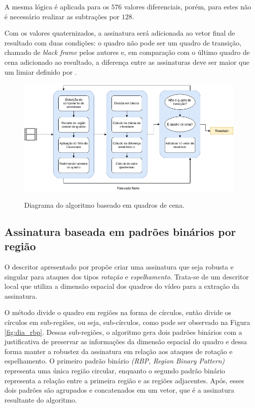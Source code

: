 A mesma lógica é aplicada para os $576$ valores diferenciais, porém, para estes não é necessário realizar as subtrações por $128$.

Com os valores quaternizados, a assinatura será adicionada ao vetor final de resultado com duas condições: o quadro não pode ser um quadro de transição, chamado de \textit{black frame} pelos autores e, em comparação com o último quadro de cena adicionado ao resultado, a diferença entre as assinaturas deve ser maior que um limiar definido por \citeauthor{mao2015sceneframe}.

 \begin{figure}[h]
      \centering
      \caption{Diagrama do algoritmo baseado em quadros de cena.}
      \includegraphics[width=\textwidth]{dados/figuras/SceneFrame.png}
       	\label{fig:dia_sceneframe}
    \end{figure}  

%
\subsection{Assinatura baseada em padrões binários por região}


O descritor apresentado por \citeauthor{kim2014rotation} propõe criar uma assinatura que seja robusta e singular para ataques dos tipos \textit{rotação} e \textit{espelhamento}. Trata-se de um descritor local que utiliza a dimensão espacial dos quadros do vídeo para a extração da assinatura. 

O método divide o quadro em regiões na forma de círculos, então divide os círculos em sub-regiões, ou seja, sub-círculos, como pode ser observado na Figura \ref{fig:dia_rbp}. Dessas sub-regiões, o algoritmo gera dois padrões binários com a justificativa de preservar as informações da dimensão espacial do quadro e dessa forma manter a robustez da assinatura em relação aos ataques de rotação e espelhamento. O  primeiro padrão binário  \textit{(RBP, Region Binary Pattern)} representa uma única região circular, enquanto o segundo padrão binário representa a relação entre a primeira região e as regiões adjacentes. Após, esses dois padrões são agrupados e concatenados em um vetor, que é a assinatura resultante do algoritmo.

